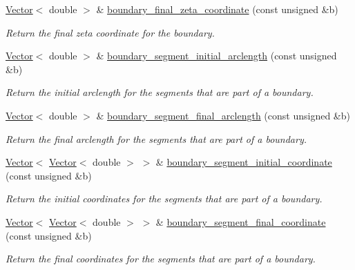 \begin{DoxyCompactItemize}
\hyperlink{classoomph_1_1Vector}{Vector}$<$ double $>$ \& \hyperlink{classoomph_1_1UnstructuredTwoDMeshGeometryBase_a261c52001f2bddc41821162ed5ccfe77}{boundary\+\_\+final\+\_\+zeta\+\_\+coordinate} (const unsigned \&b)
\begin{DoxyCompactList}\small\item\em Return the final zeta coordinate for the boundary. \end{DoxyCompactList}\item 
\hyperlink{classoomph_1_1Vector}{Vector}$<$ double $>$ \& \hyperlink{classoomph_1_1UnstructuredTwoDMeshGeometryBase_a46f0b2d486e0610acebc5eb17bc9dea0}{boundary\+\_\+segment\+\_\+initial\+\_\+arclength} (const unsigned \&b)
\begin{DoxyCompactList}\small\item\em Return the initial arclength for the segments that are part of a boundary. \end{DoxyCompactList}\item 
\hyperlink{classoomph_1_1Vector}{Vector}$<$ double $>$ \& \hyperlink{classoomph_1_1UnstructuredTwoDMeshGeometryBase_a1a97201d4f2c21a1612296a58ba2358d}{boundary\+\_\+segment\+\_\+final\+\_\+arclength} (const unsigned \&b)
\begin{DoxyCompactList}\small\item\em Return the final arclength for the segments that are part of a boundary. \end{DoxyCompactList}\item 
\hyperlink{classoomph_1_1Vector}{Vector}$<$ \hyperlink{classoomph_1_1Vector}{Vector}$<$ double $>$ $>$ \& \hyperlink{classoomph_1_1UnstructuredTwoDMeshGeometryBase_aae49290cc9b125e7e837a77e1aa8c7e8}{boundary\+\_\+segment\+\_\+initial\+\_\+coordinate} (const unsigned \&b)
\begin{DoxyCompactList}\small\item\em Return the initial coordinates for the segments that are part of a boundary. \end{DoxyCompactList}\item 
\hyperlink{classoomph_1_1Vector}{Vector}$<$ \hyperlink{classoomph_1_1Vector}{Vector}$<$ double $>$ $>$ \& \hyperlink{classoomph_1_1UnstructuredTwoDMeshGeometryBase_a2ce0bf675ce11df098c279b5f5d52f1d}{boundary\+\_\+segment\+\_\+final\+\_\+coordinate} (const unsigned \&b)
\begin{DoxyCompactList}\small\item\em Return the final coordinates for the segments that are part of a boundary. \end{DoxyCompactList}\item 

\end{DoxyCompactItemize}
